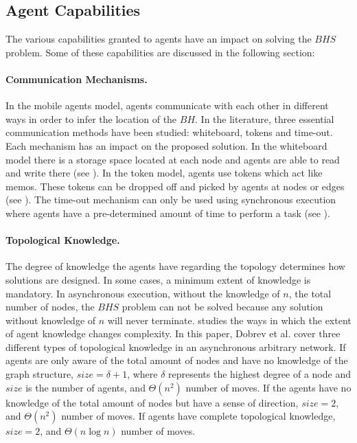 

\subsection{ Agent Capabilities}
The various capabilities granted to agents have an impact on  solving the $BHS$ problem. Some of these capabilities are discussed in the following section:
\paragraph{Communication Mechanisms.}
In the mobile agents model, agents communicate with each other in different ways in order to infer the location of the $BH$. In the literature, three essential communication methods have been studied: whiteboard, tokens and time-out. Each mechanism has an impact on the proposed solution. In the whiteboard model there is a storage space located at each node and agents are able to read and write there (see \cite{dobetal7,kosetal15,czyetal2,floetal10}). In the token model, agents use tokens which act like memos. These tokens can be dropped off and picked by agents at nodes or edges (see \cite{chaetal12,floetal9}). The time-out mechanism can only be used using synchronous execution where agents have a pre-determined amount of time to perform a task (see \cite{czyetal1,cooetal15,cooetal14}).

\paragraph{Topological Knowledge.}
The degree of knowledge the agents have regarding the topology determines how solutions are designed. In some cases, a minimum extent of knowledge is mandatory. In asynchronous execution, without the knowledge of $n$, the total number of nodes, the $BHS$ problem can not be solved because any solution without knowledge of $n$ will never terminate. \cite{dobetal7} studies the ways in which the extent of agent knowledge changes complexity. In this paper, Dobrev et al. cover three different types of topological knowledge in an asynchronous arbitrary network.  If agents are only aware of the total amount of nodes and have no knowledge of the graph structure, $size=\delta+1$, where $\delta$ represents the highest degree of a node and $size$ is the number of agents, and $\Theta(n^2)$ number of moves. If the agents have no knowledge of the total amount of nodes but have a sense of direction, 
  $size=2$, and $\Theta(n^2)$ number of moves. If agents have complete topological knowledge, $size=2$, and $\Theta(n\log n)$ number of moves. 



